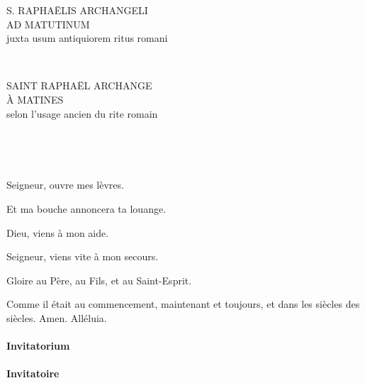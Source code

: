 \documentclass[twoside]{article}
\begin{document}
\null \newpage

\sloppy

\begin{paracol}[1]{2}

\begin{center}\begin{doublespace}

{
\MakeUppercase{\Large S. Raphaëlis Archangeli\\ad Matutinum}\\
juxta usum antiquiorem ritus romani}
\end{doublespace}\end{center}

~~

\switchcolumn

\begin{center}\begin{doublespace}
{
\MakeUppercase{\Large Saint Raphaël Archange\\À Matines}\\
selon l'usage ancien du rite romain}
\end{doublespace}\end{center}

~~

~~

\vv Seigneur, ouvre mes lèvres.

\rr Et ma bouche annoncera ta louange.

\vv Dieu, viens à mon aide.

\rr Seigneur, viens vite à mon secours.

\vv Gloire au Père, au Fils, et au Saint-Esprit.

\rr Comme il était au commencement, maintenant et toujours, et dans les siècles des siècles. Amen. Alléluia.

\switchcolumn*

\paragraph{Invitatorium}


\switchcolumn

\paragraph{Invitatoire}



\end{paracol}
\end{document}

